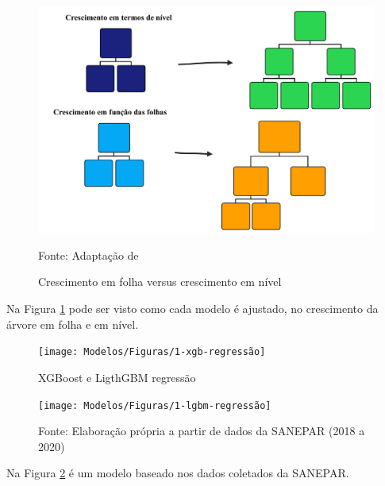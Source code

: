 \begin{figure}[H]
	\centering
	\caption{Crescimento em folha versus crescimento em nível}
	\label{fig:xgboost}
	\includegraphics[width=0.7\linewidth]{Modelos/Figuras/xgboost}
	
	Fonte: Adaptação de 
\end{figure}


Na Figura \ref{fig:xgboost} pode ser visto como cada modelo é ajustado, no crescimento da árvore em folha e em nível.

\begin{figure}[H]
	\centering
	\caption{XGBoost e LigthGBM regressão}\label{fig:1-xgb-regressao}
	\texttt{[image: Modelos/Figuras/1-xgb-regressão]}
	
\end{figure}
	
\begin{figure}[H]
	\centering
	\texttt{[image: Modelos/Figuras/1-lgbm-regressão]}	
	
	
	Fonte: Elaboração própria a partir de dados da SANEPAR (2018 a 2020)

\end{figure}

Na Figura \ref{fig:1-xgb-regressao} é um modelo baseado nos dados coletados da SANEPAR.

